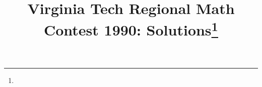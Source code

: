 \documentclass[10pt]{article}
\begin{document}
\title{Virginia Tech Regional Math Contest 1990: Solutions\footnote{\disclaimer}}
\author{\vspace{-2ex}}
\date{\vspace{-5ex}} %
\maketitle

%

%

%

%

%

%

%

%
\end{document}
